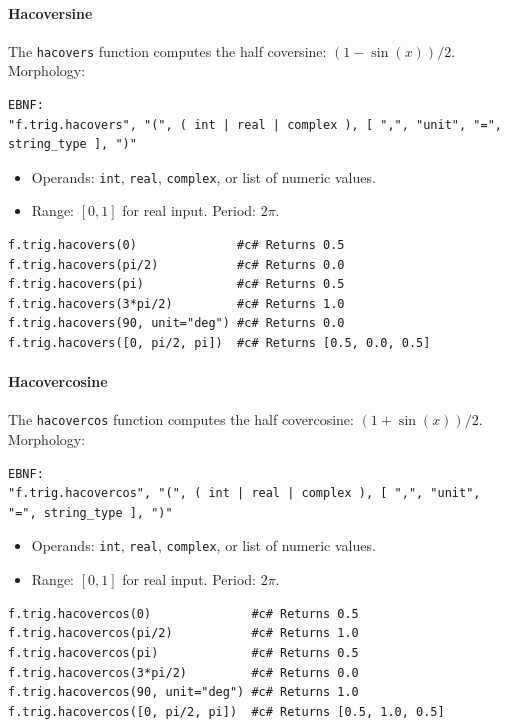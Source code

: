 \paragraph{Hacoversine}
The \texttt{hacovers} function computes the half coversine: $(1 - \sin(x))/2$.\\
Morphology:
\begin{verbatim}
EBNF:
"f.trig.hacovers", "(", ( int | real | complex ), [ ",", "unit", "=", string_type ], ")"
\end{verbatim}
\begin{itemize}
\item Operands: \texttt{int}, \texttt{real}, \texttt{complex}, or list of numeric values.
\item Range: $[0, 1]$ for real input. Period: $2\pi$.
\end{itemize}
\begin{verbatim}
f.trig.hacovers(0)              #c# Returns 0.5
f.trig.hacovers(pi/2)           #c# Returns 0.0
f.trig.hacovers(pi)             #c# Returns 0.5
f.trig.hacovers(3*pi/2)         #c# Returns 1.0
f.trig.hacovers(90, unit="deg") #c# Returns 0.0
f.trig.hacovers([0, pi/2, pi])  #c# Returns [0.5, 0.0, 0.5]
\end{verbatim}

\paragraph{Hacovercosine}
The \texttt{hacovercos} function computes the half covercosine: $(1 + \sin(x))/2$.\\
Morphology:
\begin{verbatim}
EBNF:
"f.trig.hacovercos", "(", ( int | real | complex ), [ ",", "unit", "=", string_type ], ")"
\end{verbatim}
\begin{itemize}
\item Operands: \texttt{int}, \texttt{real}, \texttt{complex}, or list of numeric values.
\item Range: $[0, 1]$ for real input. Period: $2\pi$.
\end{itemize}
\begin{verbatim}
f.trig.hacovercos(0)              #c# Returns 0.5
f.trig.hacovercos(pi/2)           #c# Returns 1.0
f.trig.hacovercos(pi)             #c# Returns 0.5
f.trig.hacovercos(3*pi/2)         #c# Returns 0.0
f.trig.hacovercos(90, unit="deg") #c# Returns 1.0
f.trig.hacovercos([0, pi/2, pi])  #c# Returns [0.5, 1.0, 0.5]
\end{verbatim}

